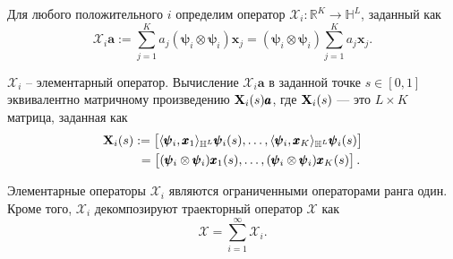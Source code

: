 \documentclass[a4paper, 11pt]{article}
\begin{document}
Для любого положительного $i$ определим оператор $\mathcal{X}_i:\mathbb{R}^K\rightarrow\mathbb{H}^L$, заданный как
\begin{equation}\label{eq: elementary oprator}
	\mathcal{X}_i \pmb{a}:=\sum_{j=1}^K a_j (\pmb{\psi}_i\otimes \pmb{\psi}_i){\pmb x}_j= (\pmb{\psi}_i\otimes \pmb{\psi}_i)\sum_{j=1}^K a_j{\pmb x}_j.
\end{equation}

$\mathcal{X}_i$ -- элементарный оператор. Вычисление $\mathcal{X}_i \pmb{a}$ в заданной точке $s\in [0,1]$ эквивалентно матричному произведению ${\bf X}_i(s)\pmb{a}$, где ${\bf X}_i(s)$ — это $L \times K$ матрица, заданная как
\begin{align}\label{eq:elementary mat}
	{\bf X}_i(s) & :=
	\begin{bmatrix} \langle\pmb{\psi}_i, {\pmb x}_1\rangle_{\mathbb{H}^L} \pmb{\psi}_i(s), \ldots, \langle\pmb{\psi}_i, {\pmb x}_K\rangle_{\mathbb{H}^L} \pmb{\psi}_i(s) \end{bmatrix}
	\notag            \\ &\ =
	\begin{bmatrix} (\pmb{\psi}_i\otimes \pmb{\psi}_i){\pmb x}_1(s), \ldots, (\pmb{\psi}_i\otimes \pmb{\psi}_i){\pmb x}_K(s) \end{bmatrix}.
\end{align}



Элементарные операторы $\mathcal{X}_i$ являются ограниченными операторами ранга один. Кроме того, $\mathcal{X}_i$ декомпозируют траекторный оператор $\mathcal{X}$ как
\begin{equation}\label{eq:elementary operators}
	\mathcal{X}=\sum_{i=1}^\infty \mathcal{X}_i.
\end{equation}
\end{document}
